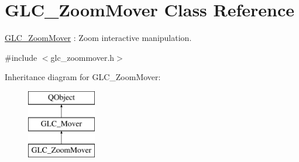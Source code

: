 \hypertarget{class_g_l_c___zoom_mover}{\section{G\-L\-C\-\_\-\-Zoom\-Mover Class Reference}
\label{class_g_l_c___zoom_mover}
}


\hyperlink{class_g_l_c___zoom_mover}{G\-L\-C\-\_\-\-Zoom\-Mover} \-: Zoom interactive manipulation.  




{\ttfamily \#include $<$glc\-\_\-zoommover.\-h$>$}

Inheritance diagram for G\-L\-C\-\_\-\-Zoom\-Mover\-:\begin{figure}[H]
\begin{center}
\leavevmode
\includegraphics[height=3.000000cm]{class_g_l_c___zoom_mover}
\end{center}
\end{figure}
